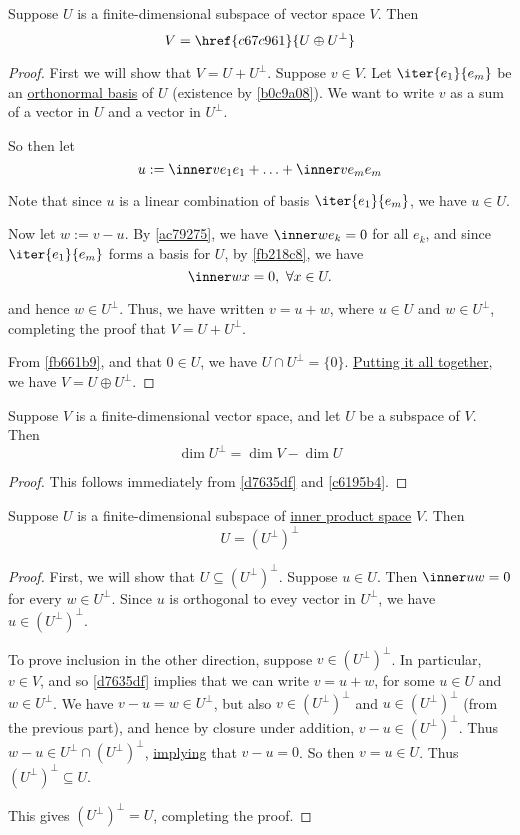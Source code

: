 \label{d7635df}

Suppose $U$ is a finite-dimensional subspace of vector space $V$. Then
$$
  V=\href{c67c961}{U\oplus U^\perp}
$$

\begin{proof}
  First we will show that \href{d7c30bb}{$V=U+U^\perp$}. Suppose $v\in V$. Let
  $\iter{e_1}{e_m}$ be an \href{e112aa0}{orthonormal basis} of $U$ (existence by
  \autoref{b0c9a08}). We want to write $v$ as a sum of a vector in $U$ and a
  vector in $U^\perp$.

  So then let
  $$
    u:=\inner v{e_1}e_1+\ldots+\inner v{e_m}e_m
  $$

  Note that since $u$ is a linear combination of basis $\iter{e_1}{e_m}$, we
  have $u\in U$.

  Now let $w:=v-u$. By \autoref{ac79275}, we have $\inner w{e_k}=0$ for all
  $e_k$, and since $\iter{e_1}{e_m}$ forms a basis for $U$, by
  \autoref{fb218c8}, we have
  $$
    \inner wx=0,\ \forall x\in U.
  $$

  and hence $w\in U^\perp$. Thus, we have written $v=u+w$, where $u\in U$ and
  $w\in U^\perp$, completing the proof that $V=U+U^\perp$.

  From \autoref{fb661b9}, and that $0\in U$, we have $U\cap U^\perp=\{0\}$.
  \href{f41081f}{Putting it all together}, we have $V=U\oplus U^\perp$.
\end{proof}

\label{a756c94}

Suppose $V$ is a finite-dimensional vector space, and let $U$ be a subspace of
$V$. Then
$$
  \dim U^\perp=\dim V-\dim U
$$

\begin{proof}
  This follows immediately from \autoref{d7635df} and \autoref{c6195b4}.
\end{proof}

\label{ab079d0}

Suppose $U$ is a finite-dimensional subspace of \href{b9935c8}{inner product
space} $V$. Then
$$
  U=(U^\perp)^\perp
$$

\begin{proof}
  First, we will show that $U\subseteq(U^\perp)^\perp$. Suppose $u\in U$. Then
  $\inner uw=0$ for every $w\in U^\perp$. Since $u$ is orthogonal to evey vector
  in $U^\perp$, we have $u\in(U^\perp)^\perp$.

  To prove inclusion in the other direction, suppose $v\in(U^\perp)^\perp$. In
  particular, $v\in V$, and so \autoref{d7635df} implies that we can write
  $v=u+w$, for some $u\in U$ and $w\in U^\perp$. We have $v-u=w\in U^\perp$,
  but also $v\in(U^\perp)^\perp$ and $u\in(U^\perp)^\perp$ (from the previous
  part), and hence by closure under addition, $v-u\in(U^\perp)^\perp$. Thus
  $w-u\in U^\perp\cap(U^\perp)^\perp$, \href{fb661b9}{implying} that $v-u=0$.
  So then $v=u\in U$. Thus $(U^\perp)^\perp\subseteq U$.

  This gives $(U^\perp)^\perp=U$, completing the proof.
\end{proof}

